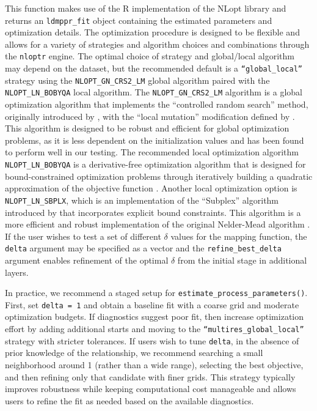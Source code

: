 {This function makes use of the R implementation of the NLopt library \citep{johnsonNLoptNonlinearoptimizationPackage2008} and returns an \texttt{ldmppr\_fit} object containing the estimated parameters and optimization details. The optimization procedure is designed to be flexible and allows for a variety of strategies and algorithm choices and combinations through the \texttt{nloptr} engine. The optimal choice of strategy and global/local algorithm may depend on the dataset, but the recommended default is a \texttt{“global\_local”} strategy using the \texttt{NLOPT\_GN\_CRS2\_LM} global algorithm paired with the \texttt{NLOPT\_LN\_BOBYQA} local algorithm. The \texttt{NLOPT\_GN\_CRS2\_LM} algorithm is a global optimization algorithm that implements the ``controlled random search'' method, originally introduced by \citet{priceGlobalOptimizationControlled1983}, with the ``local mutation'' modification defined by \citet{kaeloVariantsControlledRandom2006}. This algorithm is designed to be robust and efficient for global optimization problems, as it is less dependent on the initialization values and has been found to perform well in our testing. The recommended local optimization algorithm \texttt{NLOPT\_LN\_BOBYQA} is a derivative-free optimization algorithm that is designed for bound-constrained optimization problems through iteratively building a quadratic approximation of the objective function \citep{powell2009}. Another local optimization option is \texttt{NLOPT\_LN\_SBPLX}, which is an implementation of the ``Subplex'' algorithm introduced by \citet{rowanFunctionalStabilityAnalysis1990} that incorporates explicit bound constraints. This algorithm is a more efficient and robust implementation of the original Nelder-Mead algorithm \citep{nelderSimplexMethodFunction1965}. If the user wishes to test a set of different \(\delta\) values for the mapping function, the \texttt{delta} argument may be specified as a vector and the \texttt{refine\_best\_delta} argument enables refinement of the optimal \(\delta\) from the initial stage in additional layers.}

{In practice, we recommend a staged setup for \texttt{estimate\_process\_parameters()}. First, set \texttt{delta\ =\ 1} and obtain a baseline fit with a coarse grid and moderate optimization budgets. If diagnostics suggest poor fit, then increase optimization effort by adding additional starts and moving to the \texttt{“multires\_global\_local”} strategy with stricter tolerances. If users wish to tune \texttt{delta}, in the absence of prior knowledge of the relationship, we recommend searching a small neighborhood around 1 (rather than a wide range), selecting the best objective, and then refining only that candidate with finer grids. This strategy typically improves robustness while keeping computational cost manageable and allows users to refine the fit as needed based on the available diagnostics.}

